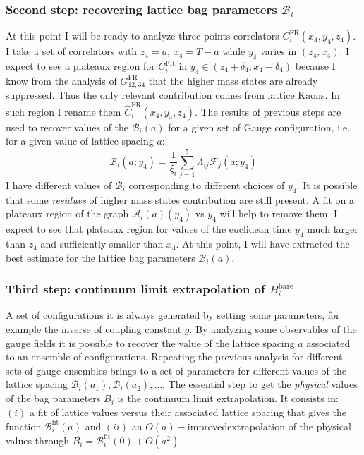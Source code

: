 \documentclass[english, LaM, oneside, noexaminfo]{sapthesis}
\newcommand{\bare}{^{\text{bare}}}
\newcommand{\oaid}{$O(a)-$improved}
\begin{document}
\subsubsection*{Second step: recovering lattice bag parameters $\mathcal{B}_i$}
\noindent
At this point I will be ready to analyze three points correlators $C_i^\text{FR}(x_4,y_4,z_4)$.
I take a set of correlators with $z_4 = a$, $x_4 = T-a$ while $y_4$ varies in $(z_4,x_4)$.
I expect to see a plateaux region for $C_i^\text{FR}$ in $y_4 \in (z_4 + \delta_4 , x_4 - \delta_4)$ because I know from the analysis of $G^\text{FR}_{12,34}$ that the higher mass states are already suppressed.
Thus the only relevant contribution comes from lattice Kaons.
In such region I rename them $\hat C_i^\text{FR}(x_4,y_4,z_4)$.
\newline
The results of previous steps are used to recover values of the $\mathcal{B}_i (a)$ for a given set of Gauge configuration, i.e. for a given value of lattice spacing $a$:
\begin{equation*}
    \mathcal{B}_i (a;y_4) = \frac{1}{\xi_i} \sum_{j=1}^5 \Lambda_{ij} \mathcal{F}_j (a;y_4)
\end{equation*}
I have different values of $\mathcal{B}_i$ corresponding to different choices of $y_4$.
It is possible that some {\it residues} of higher mass states contribution are still present.
A fit on a plateaux region of the graph $\mathcal{A}_i (a) (y_4)$ vs $y_4$ will help to remove them.
I expect to see that plateaux region for values of the euclidean time $y_4$ much larger than $z_4$ and sufficiently smaller than $x_4$.
At this point, I will have extracted the best estimate for the lattice bag parameters $\mathcal{B}_i (a)$.

\subsubsection*{Third step: continuum limit extrapolation of $B_i\bare$}
\noindent
A set of configurations it is always generated by setting some parameters, for example the inverse of coupling constant $g$.
By analyzing some observables of the gauge fields it is possible to recover the value of the lattice spacing $a$ associated to an ensemble of configurations.
\newline
Repeating the previous analysis for different sets of gauge ensembles brings to a set of parameters for different values of the lattice spacing $\mathcal{B}_i (a_1), \mathcal{B}_i (a_2), \dots$.
The essential step to get the {\it physical} values of the bag parameters $B_i$ is the continuum limit extrapolation.
It consists in:
$(i)$ a fit of lattice values versus their associated lattice spacing that gives the function $\mathcal{B}_i^\text{fit} (a) $ and
$(ii)$ an \oaid\space extrapolation of the physical values through $ B_i = \mathcal{B}_i^\text{fit} (0) + O(a^2)$.
\end{document}
